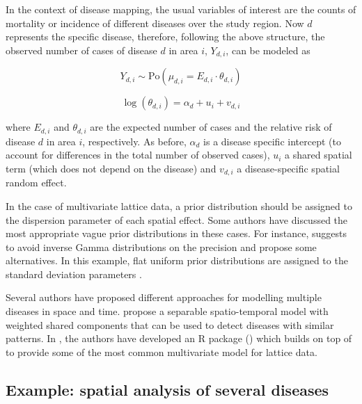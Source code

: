 
\medskip
In the context of disease mapping, the usual variables of interest are the counts of mortality or incidence of different diseases over the study region. Now $d$ represents the specific disease, therefore, following the above structure, the observed number of cases of disease $d$ in area $i$, $Y_{d, i} $, can be modeled as

$$
Y_{d, i} \sim \textrm{Po}(\mu_{d,i} = E_{d,i}\cdot \theta_{d,i})
$$

$$
\log(\theta_{d,i}) = \alpha_d + u_i + v_{d,i}
$$

\noindent
where $E_{d,i}$ and $\theta_{d,i}$ are the expected number of cases and the relative risk of disease $d$ in area $i$, respectively. As before, $\alpha_d$ is a disease specific intercept (to account for differences in the total number of observed cases), $u_i$ a shared spatial term (which does not depend on the disease) and $v_{d,i}$ a disease-specific spatial random effect. 

\medskip
In the case of multivariate lattice data, a prior distribution should be assigned to the dispersion parameter of each spatial effect. Some authors have discussed the most appropriate vague prior distributions in these cases. For instance, \citet{GelmanHCpriors} suggests to avoid inverse Gamma distributions on the precision and propose some alternatives. In this example, flat uniform prior distributions are assigned to the standard deviation parameters \citep[see Section 5.3 in][]{gomez2020bayesian}.

\medskip 
Several authors \citep[see, for example,][and the references therein]{MartinezBeneito:2013} have proposed different approaches for modelling multiple diseases in space and time. \citet{GomezRubioetal:2019} propose a separable spatio-temporal model with weighted shared components that can be used to detect diseases with similar patterns. In \citet{INLAMSM}, the authors have developed an R package () which builds on top of  to provide some of the most common multivariate model for lattice data.


\subsection{Example: spatial analysis of several diseases}

